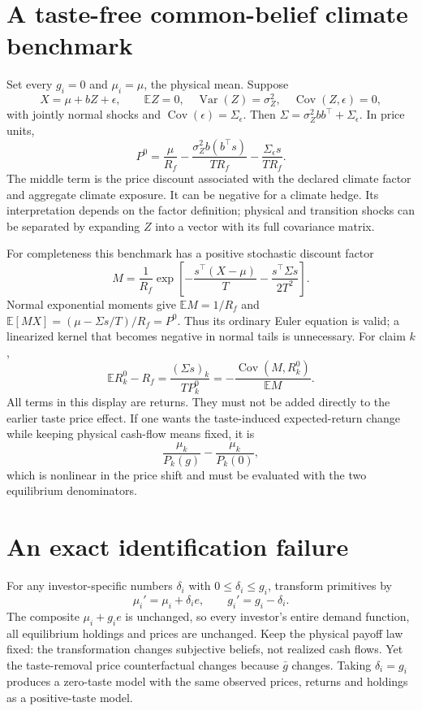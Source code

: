 \documentclass[11pt]{article}
\newcommand{\E}{\mathbb E}
\newcommand{\Var}{\operatorname{Var}}
\newcommand{\Cov}{\operatorname{Cov}}
\begin{document}
\section*{A taste-free common-belief climate benchmark}
Set every $g_i=0$ and $\mu_i=\mu$, the physical mean. Suppose
\[
 X=\mu+bZ+\epsilon,\qquad \E Z=0,\quad\Var(Z)=\sigma_Z^2,
 \quad\Cov(Z,\epsilon)=0,
\]
with jointly normal shocks and $\Cov(\epsilon)=\Sigma_\epsilon$.
Then $\Sigma=\sigma_Z^2bb^\top+\Sigma_\epsilon$. In price units,
\[
 P^0=\frac\mu{R_f}
 -\frac{\sigma_Z^2b(b^\top s)}{TR_f}
 -\frac{\Sigma_\epsilon s}{TR_f}.
\]
The middle term is the price discount associated with the declared climate factor and aggregate climate exposure. It can be negative for a climate hedge. Its interpretation depends on the factor definition; physical and transition shocks can be separated by expanding $Z$ into a vector with its full covariance matrix.

For completeness this benchmark has a positive stochastic discount factor
\[
 M=\frac1{R_f}\exp\left[-\frac{s^\top(X-\mu)}T
                       -\frac{s^\top\Sigma s}{2T^2}\right].
\]
Normal exponential moments give $\E M=1/R_f$ and
$\E[MX]=(\mu-\Sigma s/T)/R_f=P^0$.
Thus its ordinary Euler equation is valid; a linearized kernel that becomes negative in normal tails is unnecessary. For claim $k$,
\[
 \E R_k^0-R_f=\frac{(\Sigma s)_k}{TP_k^0}
             =-\frac{\Cov(M,R_k^0)}{\E M}.
\]
All terms in this display are returns. They must not be added directly to the earlier taste price effect. If one wants the taste-induced expected-return change while keeping physical cash-flow means fixed, it is
\[
 \frac{\mu_k}{P_k(g)}-\frac{\mu_k}{P_k(0)},
\]
which is nonlinear in the price shift and must be evaluated with the two equilibrium denominators.

\section*{An exact identification failure}
For any investor-specific numbers $\delta_i$ with $0\leq\delta_i\leq g_i$, transform primitives by
\[
                  \mu_i'=\mu_i+\delta_i e,\qquad
                  g_i'=g_i-\delta_i.
\]
The composite $\mu_i+g_i e$ is unchanged, so every investor's entire demand function, all equilibrium holdings and prices are unchanged. Keep the physical payoff law fixed: the transformation changes subjective beliefs, not realized cash flows. Yet the taste-removal price counterfactual changes because $\bar g$ changes. Taking $\delta_i=g_i$ produces a zero-taste model with the same observed prices, returns and holdings as a positive-taste model.
\end{document}
